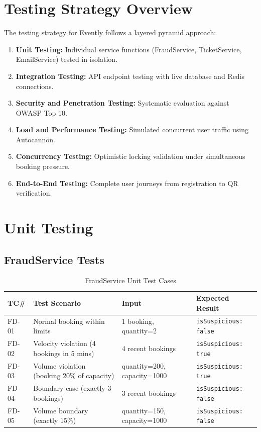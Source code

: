 \documentclass[12pt,a4paper]{report}
\begin{document}
\section{Testing Strategy Overview}
The testing strategy for Evently follows a layered pyramid approach:
\begin{enumerate}[leftmargin=2em]
    \item \textbf{Unit Testing:} Individual service functions (FraudService, TicketService, EmailService) tested in isolation.
    \item \textbf{Integration Testing:} API endpoint testing with live database and Redis connections.
    \item \textbf{Security and Penetration Testing:} Systematic evaluation against OWASP Top 10.
    \item \textbf{Load and Performance Testing:} Simulated concurrent user traffic using Autocannon.
    \item \textbf{Concurrency Testing:} Optimistic locking validation under simultaneous booking pressure.
    \item \textbf{End-to-End Testing:} Complete user journeys from registration to QR verification.
\end{enumerate}

\section{Unit Testing}

\subsection{FraudService Tests}

\begin{table}[H]
    \centering
    \caption{FraudService Unit Test Cases}
    \vspace{0.2cm}
    \begin{tabular}{|p{1.5cm}|p{5cm}|p{4cm}|p{3cm}|}
        \hline
        \textbf{TC\#} & \textbf{Test Scenario} & \textbf{Input} & \textbf{Expected Result} \\
        \hline
        FD-01 & Normal booking within limits & 1 booking, quantity=2 & \texttt{isSuspicious: false} \\
        \hline
        FD-02 & Velocity violation (4 bookings in 5 mins) & 4 recent bookings & \texttt{isSuspicious: true} \\
        \hline
        FD-03 & Volume violation (booking 20\% of capacity) & quantity=200, capacity=1000 & \texttt{isSuspicious: true} \\
        \hline
        FD-04 & Boundary case (exactly 3 bookings) & 3 recent bookings & \texttt{isSuspicious: false} \\
        \hline
        FD-05 & Volume boundary (exactly 15\%) & quantity=150, capacity=1000 & \texttt{isSuspicious: false} \\
        \hline
    \end{tabular}
\end{table}
\end{document}

